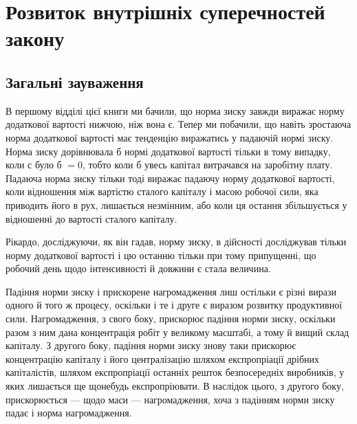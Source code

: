 
\section{Розвиток внутрішніх суперечностей закону}
\subsection{Загальні зауваження}

В першому відділі цієї книги ми бачили, що норма зиску завжди виражає норму додаткової вартості
нижчою, ніж вона є. Тепер ми побачили, що навіть зростаюча норма додаткової вартості має тенденцію
виражатись у падаючій нормі зиску. Норма
зиску дорівнювала б нормі додаткової вартості тільки в тому випадку, коли $с$ було б $= 0$, тобто коли б
увесь капітал витрачався на заробітну плату. Падаюча норма зиску тільки тоді виражає падаючу норму
додаткової вартості, коли відношення між вартістю сталого капіталу і масою робочої сили, яка
приводить його в рух, лишається незмінним, або коли ця остання збільшується у відношенні до вартості
сталого капіталу.

Рікардо, досліджуючи, як він гадав, норму зиску, в дійсності досліджував тільки норму додаткової
вартості і цю останню тільки при тому припущенні, що робочий день щодо інтенсивності й довжини є
стала величина.

Падіння норми зиску і прискорене нагромадження лиш остільки є різні вирази одного й того ж процесу,
оскільки і те і друге є виразом розвитку продуктивної сили. Нагромадження, з свого боку, прискорює
падіння норми зиску, оскільки разом з ним
дана концентрація робіт у великому масштабі, а тому й вищий склад капіталу. З другого боку, падіння
норми зиску знову таки прискорює концентрацію капіталу і його централізацію шляхом експропріації
дрібних капіталістів, шляхом експропріації
останніх решток безпосередніх виробників, у яких лишається ще щонебудь експропріювати. В наслідок
цього, з другого боку, прискорюється — щодо маси — нагромадження, хоча з падінням норми зиску падає
і норма нагромадження.

